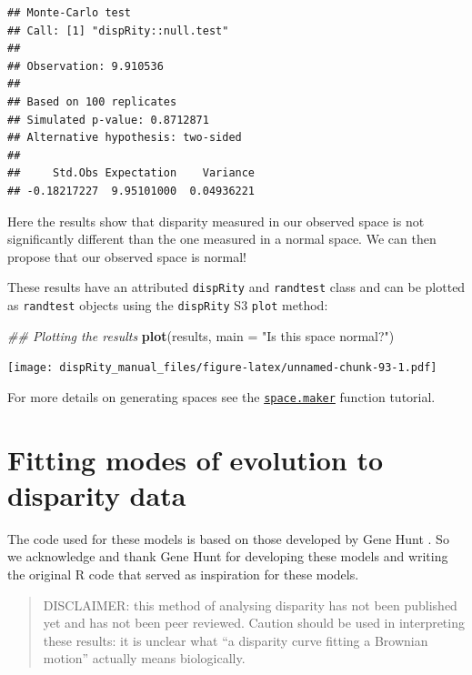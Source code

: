 \documentclass[
]{book}
\newenvironment{Shaded}{\begin{snugshade}}{\end{snugshade}}
\newcommand{\CommentTok}[1]{\textcolor[rgb]{0.56,0.35,0.01}{\textit{#1}}}
\newcommand{\DataTypeTok}[1]{\textcolor[rgb]{0.13,0.29,0.53}{#1}}
\newcommand{\KeywordTok}[1]{\textcolor[rgb]{0.13,0.29,0.53}{\textbf{#1}}}
\newcommand{\NormalTok}[1]{#1}
\newcommand{\StringTok}[1]{\textcolor[rgb]{0.31,0.60,0.02}{#1}}
\begin{document}
\begin{verbatim}
## Monte-Carlo test
## Call: [1] "dispRity::null.test"
## 
## Observation: 9.910536 
## 
## Based on 100 replicates
## Simulated p-value: 0.8712871 
## Alternative hypothesis: two-sided 
## 
##     Std.Obs Expectation    Variance 
## -0.18217227  9.95101000  0.04936221
\end{verbatim}

Here the results show that disparity measured in our observed space is not significantly different than the one measured in a normal space.
We can then propose that our observed space is normal!

These results have an attributed \texttt{dispRity} and \texttt{randtest} class and can be plotted as \texttt{randtest} objects using the \texttt{dispRity} S3 \texttt{plot} method:

\begin{Shaded}
\begin{Highlighting}[]
\CommentTok{\#\# Plotting the results}
\KeywordTok{plot}\NormalTok{(results, }\DataTypeTok{main =} \StringTok{"Is this space normal?"}\NormalTok{)}
\end{Highlighting}
\end{Shaded}

\texttt{[image: dispRity\_manual\_files/figure-latex/unnamed-chunk-93-1.pdf]}

For more details on generating spaces see the \protect\hyperlink{Simulating-multidimensional-spaces}{\texttt{space.maker}} function tutorial.

\hypertarget{model-fitting}{%
\section{Fitting modes of evolution to disparity data}\label{model-fitting}}

The code used for these models is based on those developed by Gene Hunt \citep{hunt2006fitting, hunt2012measuring, hunt2015simple}.
So we acknowledge and thank Gene Hunt for developing these models and writing the original R code that served as inspiration for these models.

\begin{quote}
DISCLAIMER: this method of analysing disparity has not been published yet and has not been peer reviewed. Caution should be used in interpreting these results: it is unclear what ``a disparity curve fitting a Brownian motion'' actually means biologically.
\end{quote}
\end{document}
